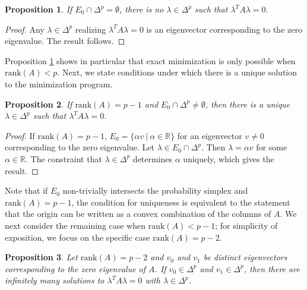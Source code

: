 \documentclass[nohyperref]{article}
\newtheorem{proposition}{Proposition}
\theoremstyle{definition}
\begin{document}
\begin{proposition}\label{prop:NoSol}
If $E_{0}\cap \Delta^{p} =\emptyset$, there is no $\lambda \in \Delta^{p}$ such that $\lambda^TA\lambda=0$. 
\end{proposition}

\begin{proof}
   Any $\lambda\in\Delta^{p}$ realizing $\lambda^TA\lambda=0$ is an eigenvector corresponding to the zero eigenvalue.  The result follows. 
\end{proof}
Proposition \ref{prop:NoSol} shows in particular that exact minimization is only possible when $\textrm{rank}(A)<p$. Next, we state conditions under which there is a unique solution to the minimization program.
\begin{proposition}
If $\textrm{rank}(A) = p-1$ and $E_{0}\cap \Delta^{p} \neq \emptyset$, then there is a unique $\lambda \in \Delta^{p}$ such that $\lambda^TA\lambda=0$. 
\end{proposition}
\begin{proof}
    If $\textrm{rank}(A) = p-1$, $E_{0}=\{\alpha v \ | \ \alpha\in\mathbb{R}\}$ for an eigenvector $v\neq 0$ corresponding to the zero eigenvalue. Let $\lambda\in E_{0}\cap \Delta^{p}$. Then $\lambda=\alpha v$ for some $\alpha\in\mathbb{R}$.  The constraint that $\lambda\in\Delta^{p}$ determines $\alpha$ uniquely, which gives the result. %
    \end{proof}

Note that if $E_{0}$ non-trivially intersects the probability simplex and $\textrm{rank}(A)=p-1$, the condition for uniqueness is equivalent to the statement that the origin can be written as a convex combination of the columns of $A$. We next consider the remaining case when $\textrm{rank}(A)<p-1$; for simplicity of exposition, we focus on the specific case $\textrm{rank}(A)=p-2$. 
\begin{proposition}
Let $\textrm{rank} (A)=p-2$ and $v_{0}$ and $v_{1}$ be distinct eigenvectors corresponding to the zero eigenvalue of $A$. If $v_{0}\in \Delta^{p}$
and $v_{1}\in \Delta^{p}$, then there are infinitely many solutions to $\lambda^TA\lambda=0$ with $\lambda \in \Delta^{p}$. 
\end{proposition}
\end{document}
